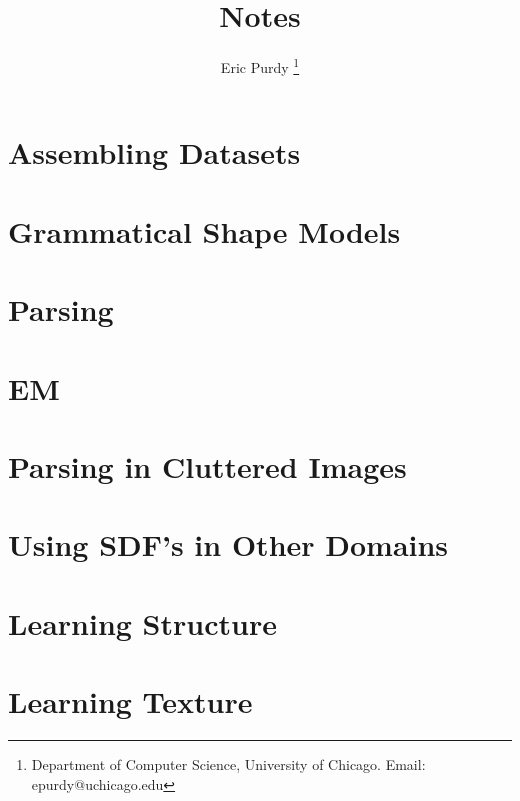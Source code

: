 \documentclass{article}
\title{Notes}
\author{Eric Purdy \footnote{Department of Computer Science, University of Chicago. Email: epurdy@uchicago.edu}}
\begin{document}
\maketitle

\section{Assembling Datasets} 

\section{Grammatical Shape Models}


\section{Parsing}


\section{EM}




\section{Parsing in Cluttered Images}

\section{Using SDF's in Other Domains}

\section{Learning Structure}


\section{Learning Texture}

\end{document}
